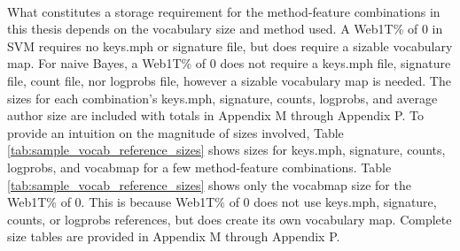 	\paragraph*{} What constitutes a storage requirement for the method-feature combinations in this thesis depends on the vocabulary size and method used.  A Web1T\% of 0 in SVM requires no keys.mph or signature file, but does require a sizable vocabulary map.  For naive Bayes, a Web1T\% of 0 does not require a keys.mph file, signature file, count file, nor logprobs file, however a sizable vocabulary map is needed.  The sizes for each combination's keys.mph, signature, counts, logprobs, and average author size are included with totals in Appendix M through Appendix P.  To provide an intuition on the magnitude of sizes involved, Table \ref{tab:sample_vocab_reference_sizes} shows sizes for keys.mph, signature, counts, logprobs, and vocabmap for a few method-feature combinations.  Table \ref{tab:sample_vocab_reference_sizes} shows only the vocabmap size for the Web1T\% of 0.  This is because Web1T\% of 0 does not use keys.mph, signature, counts, or logprobs references, but does create its own vocabulary map.  Complete size tables are provided in Appendix M through Appendix P.
	
